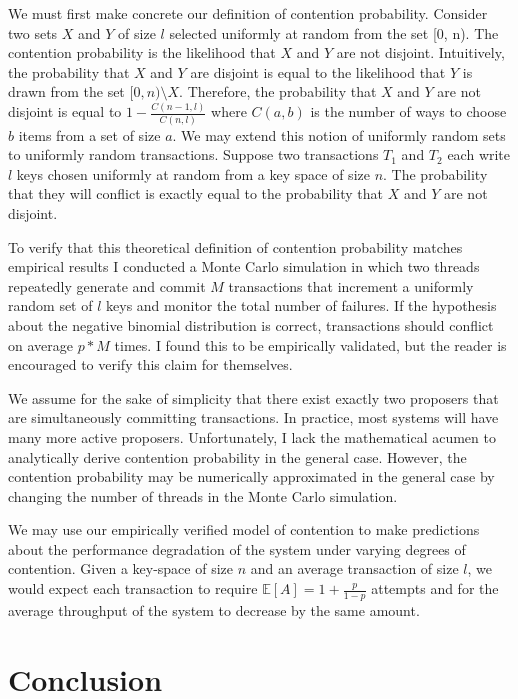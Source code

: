 \documentclass[../main.tex]{subfiles}
\begin{document}
  We must first make concrete our definition of contention probability. Consider two sets $X$ and
  $Y$ of size $l$ selected uniformly at random from the set [0, n). The contention probability is
  the likelihood that $X$ and $Y$ are not disjoint. Intuitively, the probability that $X$ and $Y$
  are disjoint is equal to the likelihood that $Y$ is drawn from the set $[0, n) \setminus X$.
  Therefore, the probability that $X$ and $Y$ are not disjoint is equal to
  $1 - \frac{C(n - 1, l)}{C(n, l)}$ where $C(a, b)$ is the number of ways to choose $b$ items from a
  set of size $a$. We may extend this notion of uniformly random sets to uniformly random
  transactions. Suppose two transactions $T_1$ and $T_2$ each write $l$ keys chosen uniformly at
  random from a key space of size $n$. The probability that they will conflict is exactly equal to
  the probability that $X$ and $Y$ are not disjoint.

  To verify that this theoretical definition of contention probability matches empirical results I
  conducted a Monte Carlo simulation in which two threads repeatedly generate and commit $M$
  transactions that increment a uniformly random set of $l$ keys and monitor the total number of
  failures. If the hypothesis about the negative binomial distribution is correct, transactions
  should conflict on average $p * M$ times. I found this to be empirically validated, but the reader
  is encouraged to verify this claim for themselves.

  We assume for the sake of simplicity that there exist exactly two proposers that are
  simultaneously committing transactions. In practice, most systems will have many more active
  proposers. Unfortunately, I lack the mathematical acumen to analytically derive contention
  probability in the general case. However, the contention probability may be numerically
  approximated in the general case by changing the number of threads in the Monte Carlo simulation.

  We may use our empirically verified model of contention to make predictions about the performance
  degradation of the system under varying degrees of contention. Given a key-space of size $n$ and
  an average transaction of size $l$, we would expect each transaction to require
  $\mathbb{E}[A] = 1 + \frac{p}{1 - p}$ attempts and for the average throughput of the system to
  decrease by the same amount.

\section{Conclusion}
\end{document}

